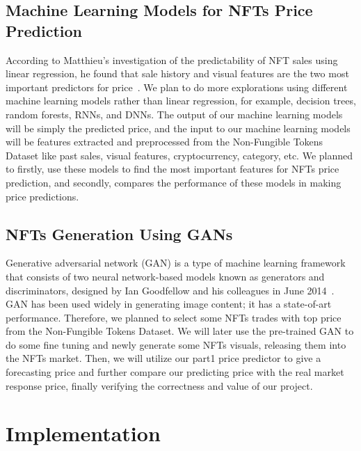 \subsection{Machine Learning Models for NFTs Price Prediction}
According to Matthieu’s investigation of the predictability of NFT sales using linear regression, he found that sale history and visual features are the two most important predictors for price~\cite{nadini2021mapping}. We plan to do more explorations using different machine learning models rather than linear regression, for example, decision trees, random forests, RNNs, and DNNs. The output of our machine learning models will be simply the predicted price, and the input to our machine learning models will be features extracted and preprocessed from the Non-Fungible Tokens Dataset like past sales, visual features, cryptocurrency, category, etc. We planned to firstly, use these models to find the most important features for NFTs price prediction, and secondly, compares the performance of these models in making price predictions. 

\subsection{NFTs Generation Using GANs}
Generative adversarial network (GAN) is a type of machine learning framework that consists of two neural network-based models known as generators and discriminators, designed by Ian Goodfellow and his colleagues in June 2014~\cite{goodfellow2014}. GAN has been used widely in generating image content; it has a state-of-art performance. Therefore, we planned to select some NFTs trades with top price from the Non-Fungible Tokens Dataset. We will later use the pre-trained GAN to do some fine tuning and newly generate some NFTs visuals, releasing them into the NFTs market. Then, we will utilize our part1 price predictor to give a forecasting price and further compare our predicting price with the real market response price, finally verifying the correctness and value of our project.


\section{Implementation}

